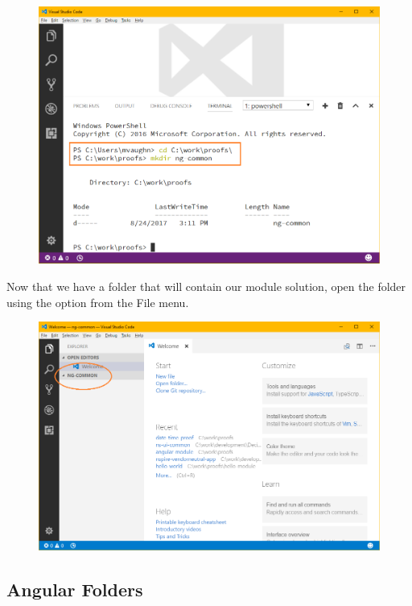 \documentclass[]{book}
\theoremstyle{definition}
\theoremstyle{definition}
\theoremstyle{definition}
\theoremstyle{remark}
\begin{document}
\begin{figure}
\centering
\includegraphics{images/create-module-folder.png}
\caption{}
\end{figure}

Now that we have a folder that will contain our module solution, open
the folder using the option from the File menu.

\begin{figure}
\centering
\includegraphics{images/open-module-folder.png}
\caption{}
\end{figure}

\subsection{Angular Folders}\label{angular-folders}
\end{document}
